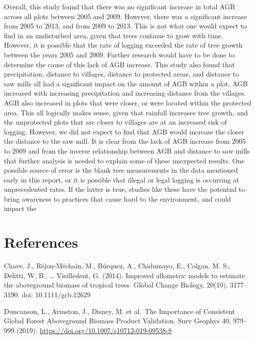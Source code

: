 \documentclass[12pt,]{article}
\begin{document}
Overall, this study found that there was no significant increase in
total AGB across all plots between 2005 and 2009. However, there was a
significant increase from 2005 to 2013, and from 2009 to 2013. This is
not what one would expect to find in an undisturbed area, given that
trees continue to grow with time. However, it is possible that the rate
of logging exceeded the rate of tree growth between the years 2005 and
2009. Further research would have to be done to determine the cause of
this lack of AGB increase. This study also found that precipitation,
distance to villages, distance to protected areas, and distance to saw
mills all had a significant impact on the amount of AGB within a plot.
AGB increased with increasing precipitation and increasing distance from
the villages. AGB also increased in plots that were closer, or were
located within the protected area. This all logically makes sense, given
that rainfall increases tree growth, and the unprotected plots that are
closer to villages are at an increased risk of logging. However, we did
not expect to find that AGB would increase the closer the distance to
the saw mill. It is clear from the lack of AGB increase from 2005 to
2009 and from the inverse relationship between AGB and distance to saw
mills that further analysis is needed to explain some of these
unexpected results. One possible source of error is the blank tree
measurements in the data mentioned early in this report, or it is
possible that illegal or legal logging is occurring at unprecedented
rates. If the latter is true, studies like these have the potential to
bring awareness to practices that cause hard to the environment, and
could impact the

\newpage

\hypertarget{references}{%
\section{References}\label{references}}

Chave, J., Réjou-Méchain, M., Búrquez, A., Chidumayo, E., Colgan, M. S.,
Delitti, W. B., \ldots{} Vieilledent, G. (2014). Improved allometric
models to estimate the aboveground biomass of tropical trees. Global
Change Biology, 20(10), 3177--3190. doi: 10.1111/gcb.12629

Duncanson, L., Armston, J., Disney, M. et al.~The Importance of
Consistent Global Forest Aboveground Biomass Product Validation. Surv
Geophys 40, 979--999 (2019).
\url{https://doi.org/10.1007/s10712-019-09538-8}
\end{document}
